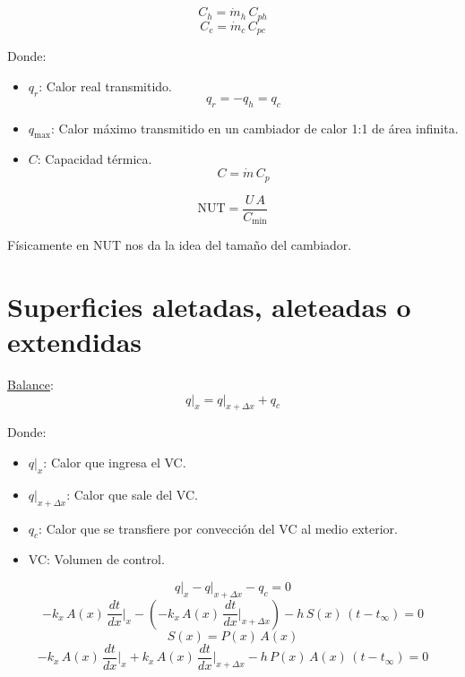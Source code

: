 \begin{equation*}
    C_h = \dot{m}_h\,C_{ph}
\end{equation*}
\begin{equation*}
    C_c = \dot{m}_c\,C_{pc}
\end{equation*}

Donde:
\begin{itemize}
    \item $q_r$: Calor real transmitido.
        \begin{equation*}
            q_r = -q_h = q_c
        \end{equation*}
    \item $q_{\text{max}}$: Calor máximo transmitido en un cambiador de calor
        1:1 de área infinita.
    \item $C$: Capacidad térmica.
        \begin{equation*}
            C = \dot{m}\,C_p
        \end{equation*}
\end{itemize}

\begin{equation}
    \text{NUT} = \frac{U\,A}{C_{\text{min}}}
\end{equation}

Físicamente en NUT nos da la idea del tamaño del cambiador.

\section{Superficies aletadas, aleteadas o extendidas}


\underline{Balance}:
\begin{equation*}
    q\Biggr|_x = q\Biggr|_{x+\Delta x} + q_c
\end{equation*}

Donde:
\begin{itemize}
    \item $q\Biggr|_x$: Calor que ingresa el VC.
    \item $q\Biggr|_{x+\Delta x}$: Calor que sale del VC.
    \item $q_c$: Calor que se transfiere por convección del VC al medio exterior.
    \item VC: Volumen de control.
\end{itemize}

\begin{equation*}
    q\Biggr|_x - q\Biggr|_{x+\Delta x} - q_c = 0
\end{equation*}
\begin{equation*}
    -k_x\,A(x)\,\frac{dt}{dx}\Biggr|_x - \left(-k_x\,A(x)\,\frac{dt}{dx}\Biggr|_{x + \Delta x}\right) - h\,S(x)\,(t-t_{\infty}) = 0
\end{equation*}
\begin{equation*}
    S(x) = P(x)\,A(x)
\end{equation*}
\begin{equation*}
    -k_x\,A(x)\,\frac{dt}{dx}\Biggr|_x + k_x\,A(x)\,\frac{dt}{dx}\Biggr|_{x + \Delta x} - h\,P(x)\,A(x)\,(t-t_{\infty}) = 0
\end{equation*}


